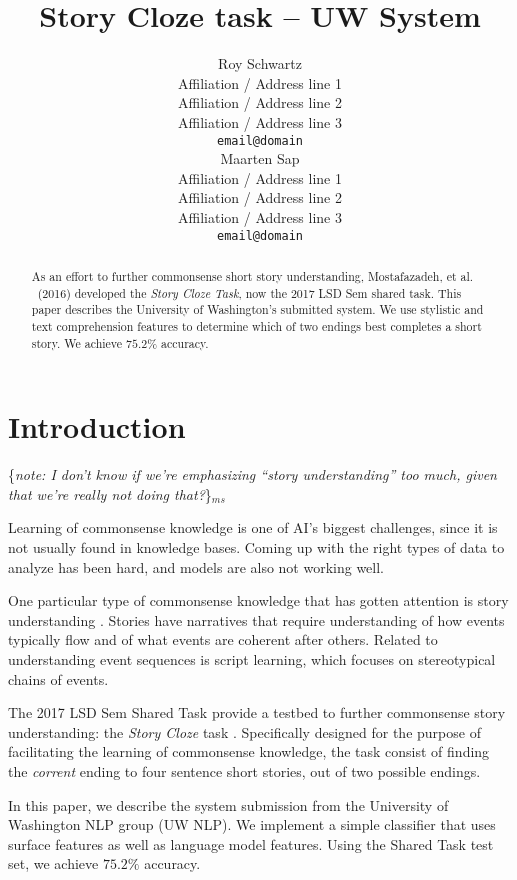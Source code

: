 \documentclass[11pt]{article}
\title{Story Cloze task -- UW System}
\author{Roy Schwartz\\
  Affiliation / Address line 1 \\
  Affiliation / Address line 2 \\
  Affiliation / Address line 3 \\
  {\tt email@domain} \\\And	
  Maarten Sap \\
  Affiliation / Address line 1 \\
  Affiliation / Address line 2 \\
  Affiliation / Address line 3 \\
  {\tt email@domain} \\}
\date{}
\newcommand{\ms}[1]{{\color{cyan}\{\textit{#1}\}$_{ms}$}}
\begin{document}
\maketitle
\begin{abstract} %
As an effort to further commonsense short story understanding, Mostafazadeh, et al. ~(2016)\nocite{Mostafazadeh:2016} developed the \textit{Story Cloze Task}, now the 2017 LSD Sem shared task. This paper describes the University of Washington's submitted system.
We use stylistic and text comprehension features to determine which of two endings best completes a short story.
We achieve $75.2\%$ accuracy.
\end{abstract}

\section{Introduction}
\ms{note: I don't know if we're emphasizing ``story understanding'' too much, given that we're really not doing that?}

Learning of commonsense knowledge is one of AI's biggest challenges, since it is not usually found in knowledge bases.
Coming up with the right types of data to analyze has been hard, and models are also not working well.

One particular type of commonsense knowledge that has gotten attention is story understanding \cite{??}. 
Stories have narratives that require understanding of how events typically flow and of what events are coherent after others.
Related to understanding event sequences is script learning, which focuses on stereotypical chains of events.

The 2017 LSD Sem Shared Task provide a testbed to further commonsense story understanding: the \textit{Story Cloze} task \cite{Mostafazadeh:2016}. Specifically designed for the purpose of facilitating the learning of commonsense knowledge, the task consist of finding the \textit{corrent} ending to four sentence short stories, out of two possible endings.

In this paper, we describe the system submission from the University of Washington NLP group (UW NLP).
We implement a simple classifier that uses surface features as well as language model features. Using the Shared Task test set, we achieve $75.2\%$ accuracy.
\end{document}
